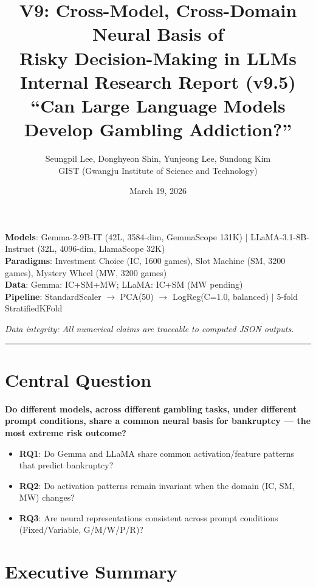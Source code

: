 \documentclass[11pt,a4paper]{article}
\title{\textbf{V9: Cross-Model, Cross-Domain Neural Basis of\\Risky Decision-Making in LLMs}\\[0.5em]
\large Internal Research Report (v9.5)\\[0.3em]
\normalsize ``Can Large Language Models Develop Gambling Addiction?''}
\author{Seungpil Lee, Donghyeon Shin, Yunjeong Lee, Sundong Kim\\
\small GIST (Gwangju Institute of Science and Technology)}
\date{March 19, 2026}
\begin{document}
\maketitle
\tableofcontents
\newpage

\noindent\textbf{Models}: Gemma-2-9B-IT (42L, 3584-dim, GemmaScope 131K) $|$ LLaMA-3.1-8B-Instruct (32L, 4096-dim, LlamaScope 32K)\\
\textbf{Paradigms}: Investment Choice (IC, 1600 games), Slot Machine (SM, 3200 games), Mystery Wheel (MW, 3200 games)\\
\textbf{Data}: Gemma: IC+SM+MW; LLaMA: IC+SM (MW pending)\\
\textbf{Pipeline}: StandardScaler $\rightarrow$ PCA(50) $\rightarrow$ LogReg(C=1.0, balanced) $|$ 5-fold StratifiedKFold

\medskip\noindent\textit{Data integrity: All numerical claims are traceable to computed JSON outputs.}

\bigskip\hrule\bigskip

\section*{Central Question}

\textbf{Do different models, across different gambling tasks, under different prompt conditions, share a common neural basis for bankruptcy --- the most extreme risk outcome?}

\begin{itemize}[nosep]
    \item \textbf{RQ1}: Do Gemma and LLaMA share common activation/feature patterns that predict bankruptcy?
    \item \textbf{RQ2}: Do activation patterns remain invariant when the domain (IC, SM, MW) changes?
    \item \textbf{RQ3}: Are neural representations consistent across prompt conditions (Fixed/Variable, G/M/W/P/R)?
\end{itemize}

\section*{Executive Summary}
\end{document}
